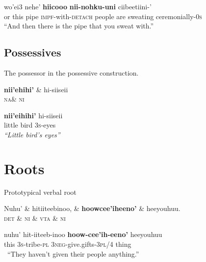 \documentclass{handout}
\begin{document}
\begin{multicols}{2}
\begin{exe}
\begin{dependency}
\end{dependency}
\gll wo'ei3 nehe' \textbf{hiicooo} \textbf{nii-nohku-uni} {ciibeetiini-'}\\
or this pipe \textsc{impf}-with-\textsc{detach} {people are sweating ceremonially-\textsc{0s}}\\
 \trans ``And then there is the pipe that you sweat with.''
\end{exe}
\subsection{Possessives}
\footnotesize
\begin{exe}
\ex \label{poss} The possessor in the possessive construction.\\
\begin{dependency}
\begin{deptext}
\textbf{nii'ehihi'} \& hi-siiseii\\
\textsc{na}\& \textsc{ni}\\
\end{deptext}
\end{dependency}
\gll \textbf{nii'eihihi'} {hi-siiseii}\\
{little bird} {3\textsc{s}-eyes}\\
\trans \textit{``Little bird's eyes''}
\end{exe}
\section{Roots}
\footnotesize
\begin{exe}
\ex \label{root} Prototypical verbal root\\ 
\begin{dependency}
\begin{deptext}
Nuhu' \& hitiiteebinoo, \& \textbf{hoowcee'iheeno'} \& heeyouhuu.\\
\textsc{det} \& \textsc{ni} \& \textsc{vta} \& \textsc{ni}\\
\end{deptext}
\end{dependency}
\gll 
nuhu' {hit-iiteeb-inoo} \textbf{hoow-cee'ih-eeno'} heeyouhuu \\
this {\textsc{3s}-tribe-\textsc{pl}} {\textsc{3neg}-give.gifts-\textsc{3pl/4}} thing \\ 
\
\trans ``They haven't given their people anything.''
\end{exe}

\end{multicols}
\end{document}
